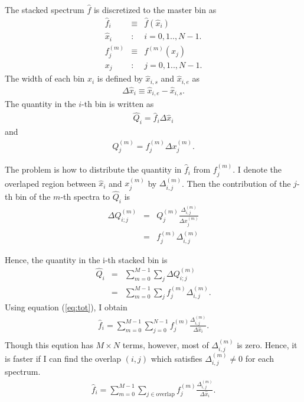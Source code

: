 \documentclass[iop, twocolumn, tighten]{emulateapj}
\begin{document}

The stacked spectrum $\hat{f}$ is discretized to the master bin as
\begin{eqnarray}
  \hat{f}_i &\equiv& \hat{f} (\hat{x}_i)  \\
  \hat{x}_i  &:& i = 0,1..,N-1. \\
  f^{(m)}_j &\equiv& f^{(m)} (x_j)  \\
  x_j  &:& j = 0,1..,N-1.
\end{eqnarray}
The width of each bin $\hat{x}_i$ is defined by $\hat{x}_{i,s}$ and $\hat{x}_{i,e}$ as 
\begin{eqnarray}
\Delta \hat{x}_i \equiv \hat{x}_{i,e} - \hat{x}_{i,s}. 
\end{eqnarray}
The quantity in the $i$-th bin is written as
\begin{eqnarray}
\label{eq:tot}
\hat{Q}_i = \hat{f}_i \Delta \hat{x}_i
\end{eqnarray}
and 
\begin{eqnarray}
Q^{(m)}_j = f^{(m)}_j \Delta x^{(m)}_j. 
\end{eqnarray}

The problem is how to distribute the quantity in $\hat{f}_i$ from $f^{(m)}_j$. I denote the overlaped region between $\hat{x}_i$ and $x^{(m)}_j$ by $\Delta^{(m)}_{i,j}$. Then the contribution of the $j$-th bin of the $m$-th spectra to $\hat{Q}_i$  is 
\begin{eqnarray}
\Delta Q^{(m)}_{i;j} &=& Q^{(m)}_j \frac{\Delta^{(m)}_{i,j}}{\Delta x^{(m)}_j} \\
                   &=& f^{(m)}_j \Delta^{(m)}_{i,j}
\end{eqnarray}

Hence, the quantity in the i-th stacked bin is 
\begin{eqnarray}
\hat{Q}_i &=& \sum_{m=0}^{M-1} \sum_j \Delta Q^{(m)}_{i;j} \\
&=& \sum_{m=0}^{M-1} \sum_j f^{(m)}_j  \Delta^{(m)}_{i,j}. 
\end{eqnarray}
Using equation (\ref{eq:tot}), I obtain
\begin{eqnarray}
\hat{f}_i = \sum_{m=0}^{M-1} \sum_{j=0}^{N-1} f^{(m)}_j \frac{\Delta^{(m)}_{i,j}}{\Delta \hat{x}_i}.\nonumber \\
\end{eqnarray}
Though this eqution has $M \times N$ terms, however, most of $\Delta^{(m)}_{i,j}$ is zero. Hence, it is faster if I can find the overlap $(i,j)$ which satisfies $\Delta^{(m)}_{i,j} \ne 0$ for each spectrum.
\begin{eqnarray}
\hat{f}_i = \sum_{m=0}^{M-1} \sum_{j \in \mathrm{overlap}} f^{(m)}_j \frac{\Delta^{(m)}_{i,j}}{\Delta \hat{x}_i}. 
\end{eqnarray}
\end{document}
